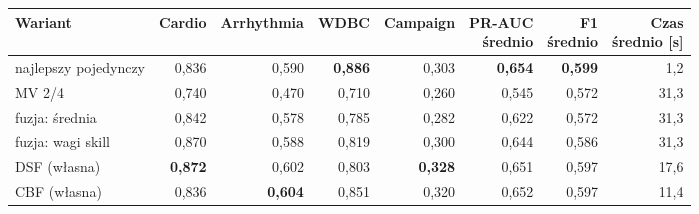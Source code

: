 \begin{tabular}{lrrrrrrr}
\toprule
Wariant & Cardio & Arrhythmia & WDBC & Campaign & \makecell[r]{PR-AUC\\średnio} & \makecell[r]{F1\\średnio} & \makecell[r]{Czas\\średnio [s]} \\
\midrule
najlepszy pojedynczy & 0,836 & 0,590 & \textbf{0,886} & 0,303 & \textbf{0,654} & \textbf{0,599} & 1,2 \\
MV 2/4 & 0,740 & 0,470 & 0,710 & 0,260 & 0,545 & 0,572 & 31,3 \\
fuzja: średnia & 0,842 & 0,578 & 0,785 & 0,282 & 0,622 & 0,572 & 31,3 \\
fuzja: wagi skill & 0,870 & 0,588 & 0,819 & 0,300 & 0,644 & 0,586 & 31,3 \\
DSF (własna) & \textbf{0,872} & 0,602 & 0,803 & \textbf{0,328} & 0,651 & 0,597 & 17,6 \\
CBF (własna) & 0,836 & \textbf{0,604} & 0,851 & 0,320 & 0,652 & 0,597 & 11,4 \\
\bottomrule
\end{tabular}
